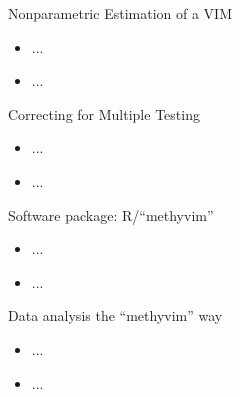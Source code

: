 \documentclass[12pt,t]{beamer}
\begin{document}

\begin{frame}[c]{Nonparametric Estimation of a VIM}

\begin{center}
\begin{itemize}
  \item ...
  \item ...
\end{itemize}
\end{center}

\note{
}

\end{frame}


\begin{frame}[c]{Correcting for Multiple Testing}

\begin{center}
\begin{itemize}
  \item ...
  \item ...
\end{itemize}
\end{center}

\note{
}

\end{frame}


\begin{frame}[c]{Software package: R/``methyvim''}

\begin{center}
\begin{itemize}
  \item ...
  \item ...
\end{itemize}
\end{center}

\note{
}

\end{frame}


\begin{frame}[c]{Data analysis the ``methyvim'' way}

\begin{center}
\begin{itemize}
  \item ...
  \item ...
\end{itemize}
\end{center}

\note{
}

\end{frame}
\end{document}
